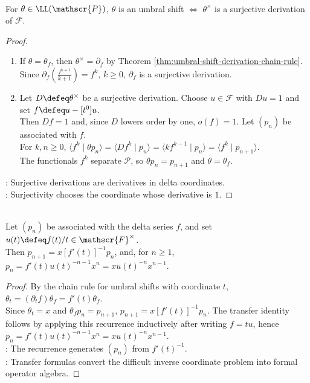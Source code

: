 \begin{theorem} \label{thm:umbral-shifts-and-derivations} \\
For $\theta\in\LL(\mathscr{P})$, $\theta$ is an umbral shift $\Longleftrightarrow$ $\theta^\times$ is a surjective derivation of $\mathscr{F}$.
\begin{proof}
\begin{enumerate}[label=\roman*.]
\setlength{\itemsep}{0pt}
\item[$(\Rightarrow)$] If $\theta=\theta_f$, then $\theta^\times=\partial_f$ by Theorem \ref{thm:umbral-shift-derivation-chain-rule}. Since $\partial_f\left(\frac{f^{k+1}}{k+1}\right)=f^k$, $k\geq0$, $\partial_f$ is a surjective derivation.
\item[$(\Leftarrow)$] Let $D\defeq\theta^\times$ be a surjective derivation. Choose $u\in\mathscr{F}$ with $Du=1$ and set $f\defeq u-[t^0]u$.\\
Then $Df=1$ and, since $D$ lowers order by one, $o(f)=1$. Let $(p_n)$ be associated with $f$.\\
For $k,n\geq0$, $\langle f^k\mid \theta p_n\rangle =\langle Df^k\mid p_n\rangle =\langle kf^{k-1}\mid p_n\rangle =\langle f^k\mid p_{n+1}\rangle$.\\
The functionals $f^k$ separate $\mathscr{P}$, so $\theta p_n=p_{n+1}$ and $\theta=\theta_f$.
\end{enumerate}
: Surjective derivations are derivatives in delta coordinates.\\
: Surjectivity chooses the coordinate whose derivative is $1$.
\end{proof}
\end{theorem}

\begin{theorem} \label{thm:associated-sequence-recurrence-and-transfer} \\
Let $(p_n)$ be associated with the delta series $f$, and set $u(t)\defeq f(t)/t\in\mathscr{F}^{\times}$.\\
Then $p_{n+1}=x[f'(t)]^{-1}p_n$, and, for $n\geq1$, $p_n=f'(t)u(t)^{-n-1}x^n=xu(t)^{-n}x^{n-1}$.
\begin{proof} By the chain rule for umbral shifts with coordinate $t$, $\theta_t=(\partial_t f)\theta_f=f'(t)\theta_f$.\\
Since $\theta_t=x$ and $\theta_f p_n=p_{n+1}$, $p_{n+1}=x[f'(t)]^{-1}p_n$. The transfer identity follows by applying this recurrence inductively after writing $f=tu$, hence $p_n=f'(t)u(t)^{-n-1}x^n=xu(t)^{-n}x^{n-1}$.\\
: The recurrence generates $(p_n)$ from $f'(t)^{-1}$.\\
: Transfer formulas convert the difficult inverse coordinate problem into formal operator algebra.
\end{proof}
\end{theorem}

